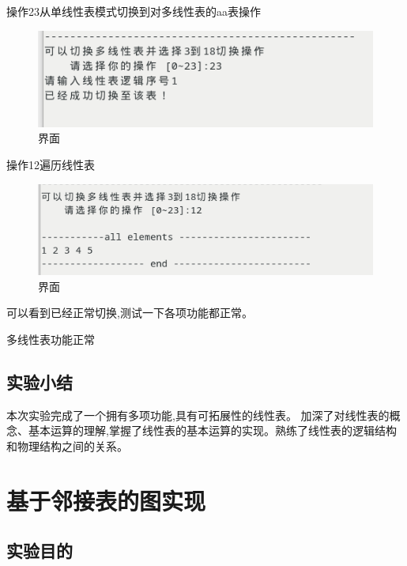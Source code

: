 \documentclass[supercite]{Experimental_Report}
\theoremstyle{definition}
\begin{document}
操作23从单线性表模式切换到对多线性表的aa表操作

\begin{figure}[!htb]
	\begin{center}
		\includegraphics[scale=0.60]{images/1-38.png}
		\caption{界面}
		\label{fig1-38}
		\end{center}
\end{figure}

操作12遍历线性表

\begin{figure}[!htb]
	\begin{center}
		\includegraphics[scale=0.60]{images/1-39.png}
		\caption{界面}
		\label{fig1-39}
		\end{center}
\end{figure}

可以看到已经正常切换,测试一下各项功能都正常。

多线性表功能正常

\subsection{实验小结}

本次实验完成了一个拥有多项功能,具有可拓展性的线性表。
加深了对线性表的概念、基本运算的理解,掌握了线性表的基本运算的实现。熟练了线性表的逻辑结构和物理结构之间的关系。

\newpage

\section{基于邻接表的图实现}

\subsection{实验目的}
\end{document}
